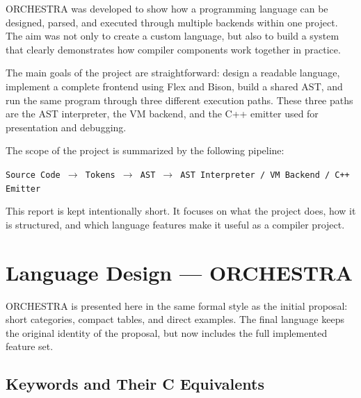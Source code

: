 \documentclass[12pt,a4paper]{article}
\begin{document}
ORCHESTRA was developed to show how a programming language can be designed, parsed, and executed through multiple backends within one project. The aim was not only to create a custom language, but also to build a system that clearly demonstrates how compiler components work together in practice.

The main goals of the project are straightforward: design a readable language, implement a complete frontend using Flex and Bison, build a shared AST, and run the same program through three different execution paths. These three paths are the AST interpreter, the VM backend, and the C++ emitter used for presentation and debugging.

The scope of the project is summarized by the following pipeline:

\begin{center}
\texttt{Source Code $\rightarrow$ Tokens $\rightarrow$ AST $\rightarrow$ AST Interpreter / VM Backend / C++ Emitter}
\end{center}

This report is kept intentionally short. It focuses on what the project does, how it is structured, and which language features make it useful as a compiler project.

\section{Language Design --- ORCHESTRA}

ORCHESTRA is presented here in the same formal style as the initial proposal: short categories, compact tables, and direct examples. The final language keeps the original identity of the proposal, but now includes the full implemented feature set.

\subsection*{Keywords and Their C Equivalents}
\end{document}
